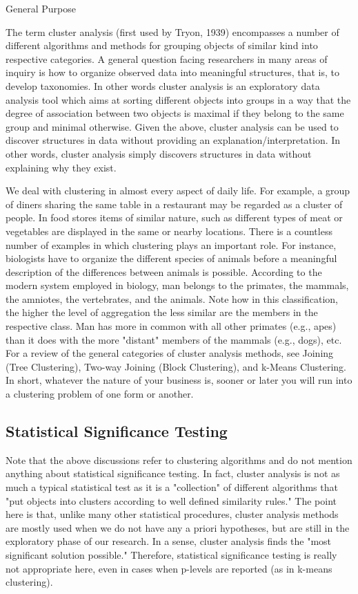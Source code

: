 General Purpose

The term cluster analysis (first used by Tryon, 1939) encompasses a number of different algorithms and methods for grouping objects of similar kind into respective categories. A general question facing researchers in many areas of inquiry is how to organize observed data into meaningful structures, that is, to develop taxonomies. In other words cluster analysis is an exploratory data analysis tool which aims at sorting different objects into groups in a way that the degree of association between two objects is maximal if they belong to the same group and minimal otherwise. Given the above, cluster analysis can be used to discover structures in data without providing an explanation/interpretation. In other words, cluster analysis simply discovers structures in data without explaining why they exist.

We deal with clustering in almost every aspect of daily life. For example, a group of diners sharing the same table in a restaurant may be regarded as a cluster of people. In food stores items of similar nature, such as different types of meat or vegetables are displayed in the same or nearby locations. There is a countless number of examples in which clustering plays an important role. For instance, biologists have to organize the different species of animals before a meaningful description of the differences between animals is possible. According to the modern system employed in biology, man belongs to the primates, the mammals, the amniotes, the vertebrates, and the animals. Note how in this classification, the higher the level of aggregation the less similar are the members in the respective class. Man has more in common with all other primates (e.g., apes) than it does with the more "distant" members of the mammals (e.g., dogs), etc. For a review of the general categories of cluster analysis methods, see Joining (Tree Clustering), Two-way Joining (Block Clustering), and k-Means Clustering. In short, whatever the nature of your business is, sooner or later you will run into a clustering problem of one form or another.

\subsection*{Statistical Significance Testing}

Note that the above discussions refer to clustering algorithms and do not mention anything about statistical significance testing. In fact, cluster analysis is not as much a typical statistical test as it is a "collection" of different algorithms that "put objects into clusters according to well defined similarity rules." The point here is that, unlike many other statistical procedures, cluster analysis methods are mostly used when we do not have any a priori hypotheses, but are still in the exploratory phase of our research. In a sense, cluster analysis finds the "most significant solution possible." Therefore, statistical significance testing is really not appropriate here, even in cases when p-levels are reported (as in k-means clustering).

